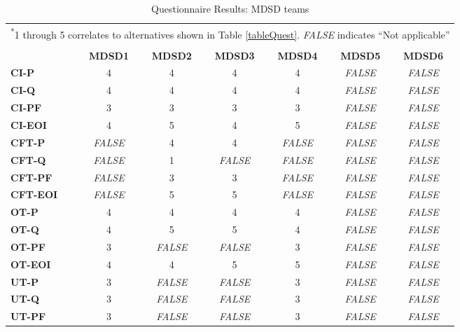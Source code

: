 \documentclass[final_report_innit.tex]{subfiles}
\begin{document}
\begin{table}
\centering
\caption{Questionnaire Results: MDSD teams}
\begin{tabular}[b]{l | c | c | c | c | c | c}
	\multicolumn{7}{c}{\textsuperscript{*}\footnotesize{\cellcolor{greyEven}1 through 5 correlates to alternatives shown in Table \ref{tableQuest}. \textit{FALSE} indicates ``Not applicable''}} \\
	\multicolumn{7}{c}{\cellcolor{greyEven}} \\
	& \textbf{MDSD1} & \textbf{MDSD2} & \textbf{MDSD3} & \textbf{MDSD4} & \textbf{MDSD5} & \textbf{MDSD6} \\ %
	\textbf{CI-P} & 4 & 4 & 4 & 4 & \textit{FALSE} & \textit{FALSE} \\ %
	\textbf{CI-Q} & 4 & 4 & 4 & 4 & \textit{FALSE} & \textit{FALSE} \\ %
	\textbf{CI-PF} & 3 & 3 & 3 & 3 & \textit{FALSE} & \textit{FALSE} \\ %
	\textbf{CI-EOI} & 4 & 5 & 4 & 5 & \textit{FALSE} & \textit{FALSE} \\ %
	\textbf{CFT-P} & \textit{FALSE} & 4 & 4 & \textit{FALSE} & \textit{FALSE} & \textit{FALSE} \\ %
	\textbf{CFT-Q} & \textit{FALSE} & 1 & \textit{FALSE} & \textit{FALSE} & \textit{FALSE} & \textit{FALSE} \\ %
	\textbf{CFT-PF} & \textit{FALSE} & 3 & 3 & \textit{FALSE} & \textit{FALSE} & \textit{FALSE} \\ %
	\textbf{CFT-EOI} & \textit{FALSE} & 5 & 5 & \textit{FALSE} & \textit{FALSE} & \textit{FALSE} \\ %
	\textbf{OT-P} & 4 & 4 & 4 & 4 & \textit{FALSE} & \textit{FALSE} \\ %
	\textbf{OT-Q} & 4 & 5 & 5 & 4 & \textit{FALSE} & \textit{FALSE} \\ %
	\textbf{OT-PF} & 3 & \textit{FALSE} & \textit{FALSE} & 3 & \textit{FALSE} & \textit{FALSE} \\ %
	\textbf{OT-EOI} & 4 & 4 & 5 & 5 & \textit{FALSE} & \textit{FALSE} \\ %
	\textbf{UT-P} & 3 & \textit{FALSE} & \textit{FALSE} & 3 & \textit{FALSE} & \textit{FALSE} \\ %
	\textbf{UT-Q} & 3 & \textit{FALSE} & \textit{FALSE} & 3 & \textit{FALSE} & \textit{FALSE} \\ %
	\textbf{UT-PF} & 3 & \textit{FALSE} & \textit{FALSE} & 3 & \textit{FALSE} & \textit{FALSE} \\ %

\end{tabular}
\end{table}
\end{document}
